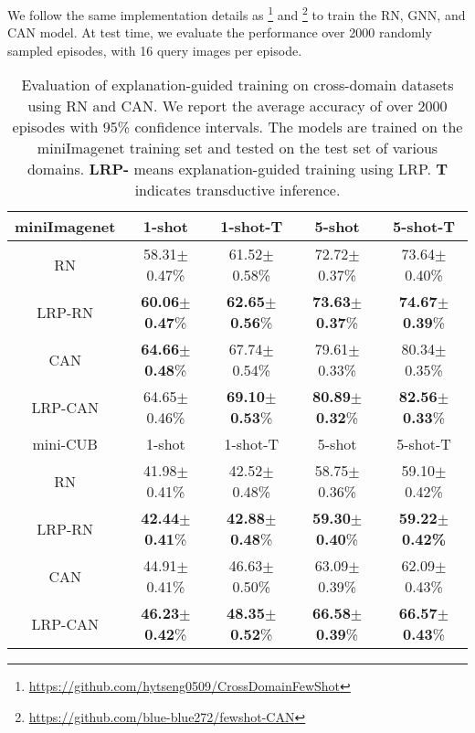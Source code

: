 \documentclass[a4paper,conference]{IEEEtran}
\begin{document}
We follow the same implementation details as  \cite{FeaturewiseTranslayer:tseng2020cross}\footnote{\url{https://github.com/hytseng0509/CrossDomainFewShot}} and \cite{CAN:hou2019cross}\footnote{\url{https://github.com/blue-blue272/fewshot-CAN}} to train the RN, GNN, and CAN model. 
At test time, we evaluate the performance over 2000 randomly sampled episodes, with 16 query images per episode.
\begin{table*}[htb]
    \centering
\caption{Evaluation of explanation-guided training on cross-domain datasets using RN and CAN. We report the average accuracy of over 2000 episodes with 95\% confidence intervals. The models are trained on the miniImagenet training set and tested on the test set of various domains. \textbf{LRP-} means explanation-guided training using LRP. \textbf{T }indicates transductive inference.}
        \begin{tabular}{c c c c c}
    \hline
      miniImagenet  & 1-shot                    &1-shot-T                   & 5-shot                     & 5-shot-T \\ \hline
      RN            & 58.31$\pm$0.47\%          &61.52$\pm$0.58\%           & 72.72$\pm$0.37\%           &73.64$\pm$0.40\%\\ 
      LRP-RN        & \textbf{60.06}$\pm$\textbf{0.47}\% &\textbf{62.65}$\pm$\textbf{0.56}\%  &\textbf{73.63}$\pm$\textbf{0.37}\%   &\textbf{74.67}$\pm$\textbf{0.39}\%\\ 
      CAN           & \textbf{64.66}$\pm$\textbf{0.48}\% &67.74$\pm$0.54\%           & 79.61$\pm$0.33\%           &80.34$\pm$0.35\%\\
      LRP-CAN       & 64.65$\pm$0.46\%          &\textbf{69.10}$\pm$\textbf{0.53}\%  & \textbf{80.89}$\pm$\textbf{0.32}\%  &\textbf{82.56}$\pm$\textbf{0.33}\%\\ 
\hline\hline
      mini-CUB      & 1-shot                    &1-shot-T                   & 5-shot                     & 5-shot-T \\ \hline
      RN            & 41.98$\pm$0.41\%          &42.52$\pm$0.48\%           & 58.75$\pm$0.36\%           &59.10$\pm$0.42\%\\ 
      LRP-RN        & \textbf{42.44}$\pm$\textbf{0.41}\% &\textbf{42.88}$\pm$\textbf{0.48}\%  & \textbf{59.30}$\pm$\textbf{0.40}\%  &\textbf{59.22}$\pm$\textbf{0.42\%}\\ 
      CAN           & 44.91$\pm$0.41\%          &46.63$\pm$0.50\%           & 63.09$\pm$0.39\%           &62.09$\pm$0.43\%\\
      LRP-CAN       & \textbf{46.23}$\pm$\textbf{0.42}\% &\textbf{48.35}$\pm$\textbf{0.52}\%  & \textbf{66.58}$\pm$\textbf{0.39}\%  &\textbf{66.57}$\pm$\textbf{0.43}\%\\ 
\hline\hline
     

\end{tabular}
\end{table*}
\end{document}

